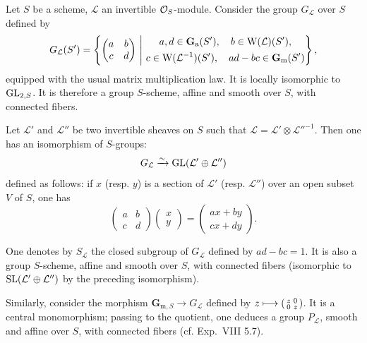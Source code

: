 \label{XX.sec.5}
 Let $S$ be a scheme, $\mathcal L$ an invertible $\mathcal{O}_S$-module. Consider the group $G_{\mathcal L}$ over $S$ defined by
\[
G_{\mathcal L}(S')=\left\{\begin{pmatrix}a&b\\c&d\end{pmatrix}\ \middle|\
\begin{gathered}a,d\in\mathbf{G}_{\mathrm{a}}(S'),\quad b\in\mathrm W(\mathcal L)(S'),\\
c\in\mathrm W(\mathcal L^{-1})(S'),\quad ad-bc\in\mathbf{G}_{\mathrm{m}}(S')\end{gathered}\right\},
\]
equipped with the usual matrix multiplication law. It is locally isomorphic to $\operatorname{GL}_{2,S}$. It is therefore a group $S$-scheme, affine and smooth over $S$, with connected fibers.

\begin{remark*}
Let $\mathcal L'$ and $\mathcal L''$ be two invertible sheaves on $S$ such that $\mathcal L=\mathcal L'\otimes\mathcal L''^{-1}$.{\renewcommand{\thefootnote}{(31)}} Then one has an isomorphism of $S$-groups:
\[
G_{\mathcal L}\xrightarrow{\sim}\operatorname{GL}(\mathcal L'\oplus\mathcal L'')
\]
defined as follows: if $x$ (resp. $y$) is a section of $\mathcal L'$ (resp. $\mathcal L''$) over an open subset $V$ of $S$, one has
\[
\begin{pmatrix}a&b\\c&d\end{pmatrix}\begin{pmatrix}x\\y\end{pmatrix}=\begin{pmatrix}ax+by\\cx+dy\end{pmatrix}.
\]
\end{remark*}

 One denotes by $S_{\mathcal L}$ the closed subgroup of $G_{\mathcal L}$ defined by $ad-bc=1$. It is also a group $S$-scheme, affine and smooth over $S$, with connected fibers (isomorphic to $\operatorname{SL}(\mathcal L'\oplus\mathcal L'')$ by the preceding isomorphism).

Similarly, consider the morphism $\mathbf G_{\mathrm m,S}\to G_{\mathcal L}$ defined by $z\longmapsto\left(\begin{smallmatrix}z&0\\0&z\end{smallmatrix}\right)$. It is a central monomorphism; passing to the quotient, one deduces a group $P_{\mathcal L}$, smooth and affine over $S$, with connected fibers (cf. Exp.~VIII 5.7).

